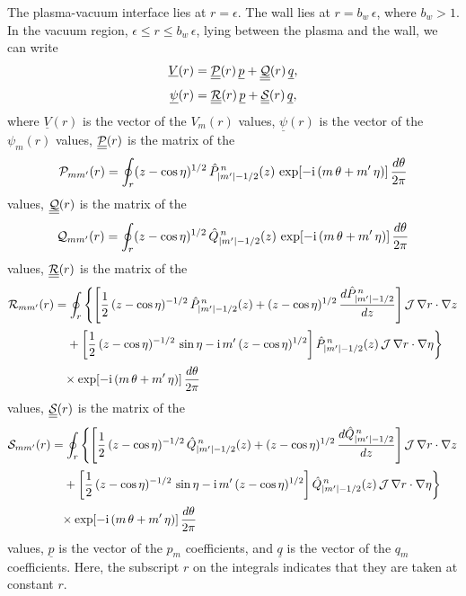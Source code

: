 \documentclass[12pt,prb,aps,notitlepage]{revtex4-1}
\begin{document}
The plasma-vacuum interface lies at $r=\epsilon$. The wall lies at $r=b_w\,\epsilon$, where $b_w>1$.  In the
vacuum region, $\epsilon\leq r\leq b_w\,\epsilon$,  lying between the plasma and the wall, we can write
\begin{align}\label{e32a}
\underline{V}(r)&= \underline{\underline{{\cal P}}}(r)\,\underline{p}+ \underline{\underline{{\cal Q}}}(r)\,\underline{q},\\[0.5ex]
\underline{\psi}(r)&= \underline{\underline{{\cal R}}}(r)\,\underline{p}+ \underline{\underline{{\cal S}}}(r)\,\underline{q},\label{e33a}
\end{align}
where $\underline{V}(r)$ is the vector of the $V_m(r)$ values, $\underline{\psi}(r)$ is the vector of the $\psi_m(r)$ values, $\underline{\underline{{\cal P}}}(r)$ is the
matrix of the
\begin{equation}
{\cal P}_{mm'}(r)=\oint_{r}(z-\cos\eta)^{1/2}\,\hat{P}_{|m'|-1/2}^{\,n}(z)\,\exp[-{\rm i}\,(m\,\theta+m'\,\eta)]\,\frac{d\theta}{2\pi}
\end{equation}
values, 
$\underline{\underline{{\cal Q}}}(r)$ is the
matrix of the
\begin{equation}
{\cal Q}_{mm'}(r)=\oint_{r}(z-\cos\eta)^{1/2}\,\hat{Q}_{|m'|-1/2}^{\,n}(z)\,\exp[-{\rm i}\,(m\,\theta+m'\,\eta)]\,\frac{d\theta}{2\pi}
\end{equation}
values, $\underline{\underline{{\cal R}}}(r)$ is the matrix of the 
\begin{align}\label{e354}
{\cal R}_{mm'}(r) &=\oint_{r}
\left\{\left[\frac{1}{2}\,(z-\cos\eta)^{-1/2}\,\hat{P}_{|m'|-1/2}^{\,n}(z)+(z-\cos\eta)^{1/2}\,\frac{d\hat{P}_{|m'|-1/2}^{\,n}}{dz}\right]{\cal J}\,\nabla r\cdot \nabla z
\right.\nonumber\\[0.5ex]&
\left.\phantom{=}+\left[\frac{1}{2}\,(z-\cos\eta)^{-1/2}\,\sin\eta-{\rm i}\,m'\,(z-\cos\eta)^{1/2}\right]\hat{P}_{|m'|-1/2}^{\,n}(z)\,{\cal J}\,\nabla r\cdot \nabla \eta
\right\}\nonumber\\[0.5ex] &
\phantom{=}\times\exp[-{\rm i}\,(m\,\theta+m'\,\eta)]\,\frac{d\theta}{2\pi}
\end{align}
values, 
$\underline{\underline{{\cal S}}}(r)$ is the matrix of the 
\begin{align}\label{e355}
{\cal S}_{mm'}(r) &=\oint_{r}
\left\{\left[\frac{1}{2}\,(z-\cos\eta)^{-1/2}\,\hat{Q}_{|m'|-1/2}^{\,n}(z)+(z-\cos\eta)^{1/2}\,\frac{d\hat{Q}_{|m'|-1/2}^{\,n}}{dz}\right]{\cal J}\,\nabla r\cdot \nabla z
\right.\nonumber\\[0.5ex]&
\left.\phantom{=}+\left[\frac{1}{2}\,(z-\cos\eta)^{-1/2}\,\sin\eta-{\rm i}\,m'\,(z-\cos\eta)^{1/2}\right]\hat{Q}_{|m'|-1/2}^{\,n}(z)\,{\cal J}\,\nabla r\cdot \nabla \eta
\right\}\nonumber\\[0.5ex] &
\phantom{=}\times\exp[-{\rm i}\,(m\,\theta+m'\,\eta)]\,\frac{d\theta}{2\pi}
\end{align}
values, $\underline{p}$ is the vector of the $p_m$ coefficients, and  $\underline{q}$ is the vector of the $q_m$ coefficients. Here, the
subscript $r$ on the integrals indicates that they are taken at constant $r$. 
\end{document}

